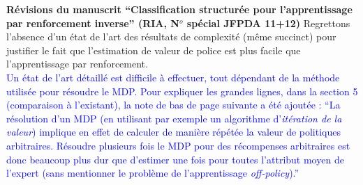 \documentclass[11pt, a4paper]{letter}
\begin{document}
\begin{letter}{\large \textbf{Révisions du manuscrit ``Classification structurée pour l'apprentissage par renforcement inverse'' (RIA, N$^o$ spécial JFPDA 11+12)}}
Regrettons l'absence d'un état de l'art des résultats de complexité (même succinct) pour justifier le fait que l'estimation de valeur de police est plus facile que l'apprentissage par renforcement. \\
  \textcolor{blue}{Un état de l'art détaillé est difficile à effectuer, tout dépendant de la méthode utilisée pour résoudre le MDP. Pour expliquer les grandes lignes, dans la section 5 (comparaison à l'existant), la note de bas de page suivante a été ajoutée : ``La résolution d'un MDP (en utilisant par exemple un algorithme d'\emph{itération de la valeur}) implique en effet de calculer de manière répétée la valeur de politiques arbitraires. Résoudre plusieurs fois le MDP pour des récompenses arbitraires est donc beaucoup plus dur que d'estimer une fois pour toutes l'attribut moyen de l'expert (sans mentionner le problème de l'apprentissage \emph{off-policy}).''}\\
  

\end{letter}
\end{document}
